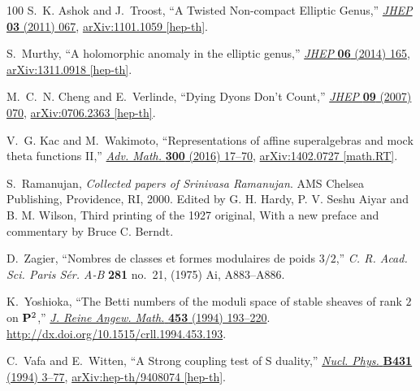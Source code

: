 \begin{thebibliography}{100}
S.~K. Ashok and J.~Troost, ``{A Twisted Non-compact Elliptic Genus},''
  \href{http://dx.doi.org/10.1007/JHEP03(2011)067}{{\em JHEP} {\bfseries 03}
  (2011) 067},
\href{http://arxiv.org/abs/1101.1059}{{\ttfamily arXiv:1101.1059 [hep-th]}}.

S.~Murthy, ``{A holomorphic anomaly in the elliptic genus},''
  \href{http://dx.doi.org/10.1007/JHEP06(2014)165}{{\em JHEP} {\bfseries 06}
  (2014) 165},
\href{http://arxiv.org/abs/1311.0918}{{\ttfamily arXiv:1311.0918 [hep-th]}}.

M.~C.~N. Cheng and E.~Verlinde, ``{Dying Dyons Don't Count},''
  \href{http://dx.doi.org/10.1088/1126-6708/2007/09/070}{{\em JHEP} {\bfseries
  09} (2007) 070},
\href{http://arxiv.org/abs/0706.2363}{{\ttfamily arXiv:0706.2363 [hep-th]}}.

V.~G. Kac and M.~Wakimoto, ``{Representations of affine superalgebras and mock
  theta functions II},''
  \href{http://dx.doi.org/10.1016/j.aim.2016.03.015}{{\em Adv. Math.}
  {\bfseries 300} (2016) 17--70},
\href{http://arxiv.org/abs/1402.0727}{{\ttfamily arXiv:1402.0727 [math.RT]}}.

S.~Ramanujan, {\em Collected papers of {S}rinivasa {R}amanujan}.
\newblock AMS Chelsea Publishing, Providence, RI, 2000.
\newblock Edited by G. H. Hardy, P. V. Seshu Aiyar and B. M. Wilson, Third
  printing of the 1927 original, With a new preface and commentary by Bruce C.
  Berndt.

D.~Zagier, ``Nombres de classes et formes modulaires de poids {$3/2$},'' {\em
  C. R. Acad. Sci. Paris S\'er. A-B} {\bfseries 281} no.~21, (1975) Ai,
  A883--A886.

K.~Yoshioka, ``The {B}etti numbers of the moduli space of stable sheaves of
  rank {$2$} on {$\bold P^2$},''
  \href{http://dx.doi.org/10.1515/crll.1994.453.193}{{\em J. Reine Angew.
  Math.} {\bfseries 453} (1994) 193--220}.
  \url{http://dx.doi.org/10.1515/crll.1994.453.193}.

C.~Vafa and E.~Witten, ``{A Strong coupling test of S duality},''
  \href{http://dx.doi.org/10.1016/0550-3213(94)90097-3}{{\em Nucl. Phys.}
  {\bfseries B431} (1994) 3--77},
\href{http://arxiv.org/abs/hep-th/9408074}{{\ttfamily arXiv:hep-th/9408074
  [hep-th]}}.


\end{thebibliography}
